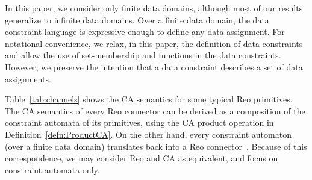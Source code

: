 \documentclass[submission,copyright,creativecommons,hidelinks]{eptcs}
\theoremstyle{plain} \newtheorem{theorem}{Theorem}
\theoremstyle{definition}
\theoremstyle{remark}
\newcommand{\defn}[1]{Definition~\ref{defn:#1}}
\newcommand{\tab}[1]{Table~\ref{tab:#1}}
\begin{document}
In this paper, we consider only finite data domains, although most of our results generalize to infinite data domains. Over a finite data domain, the data constraint language  is expressive enough to define any data assignment. 
For notational convenience, we relax, in this paper, the definition of data constraints and allow the use of set-membership and functions in the data constraints. However, we preserve the intention that a data constraint describes a set of data assignments.

\tab{channels} shows the CA semantics for some typical Reo primitives.
The CA semantics of every Reo connector can be derived as a composition of the constraint automata of its primitives, using the CA product operation in \defn{ProductCA}.
On the other hand, every constraint automaton (over a finite data domain) translates back into a Reo connector~\cite{BKK14}.
Because of this correspondence, we may consider Reo and CA as equivalent, and focus on constraint automata only.
\end{document}

